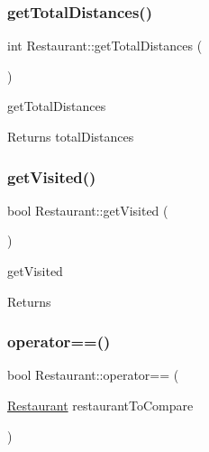 \subsubsection{\texorpdfstring{get\+Total\+Distances()}{getTotalDistances()}}
{\footnotesize\ttfamily int Restaurant\+::get\+Total\+Distances (\begin{DoxyParamCaption}{ }\end{DoxyParamCaption})}



get\+Total\+Distances 

\begin{DoxyReturn}{Returns}
total\+Distances 
\end{DoxyReturn}
\mbox{\label{class_restaurant_a174725e8ae4487dbb649dd9cc017945e}} 
\subsubsection{\texorpdfstring{get\+Visited()}{getVisited()}}
{\footnotesize\ttfamily bool Restaurant\+::get\+Visited (\begin{DoxyParamCaption}{ }\end{DoxyParamCaption})\hspace{0.3cm}{\ttfamily [inline]}}



get\+Visited 

\begin{DoxyReturn}{Returns}

\end{DoxyReturn}
\mbox{\label{class_restaurant_ac8b5a5436f9e3952f64abc32dc02a82b}} 
\subsubsection{\texorpdfstring{operator==()}{operator==()}}
{\footnotesize\ttfamily bool Restaurant\+::operator== (\begin{DoxyParamCaption}\item[{\hyperlink{class_restaurant}{Restaurant}}]{restaurant\+To\+Compare }\end{DoxyParamCaption})\hspace{0.3cm}{\ttfamily [inline]}}



